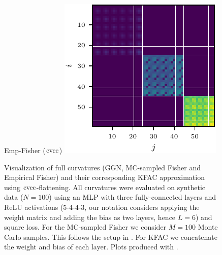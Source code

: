 \begin{figure}[t!]
\begin{minipage}[t]{0.485\linewidth}
  \end{minipage}
  \hfill
  \begin{minipage}[t]{0.485\linewidth}
    \centering
    Emp-Fisher ($\operatorname{cvec}$)\vspace{1ex}
    \includegraphics[width=0.8\linewidth]{../kfs/plots/synthetic_cvec_empfisher_kfac.pdf}
  \end{minipage}
    \caption{Visualization of full curvatures (GGN, MC-sampled Fisher and Empirical Fisher) and their corresponding KFAC approximation using $\operatorname{cvec}$-flattening. All curvatures were evaluated on synthetic data ($N = 100$) using an MLP with three fully-connected layers and ReLU activations (5-4-4-3, our notation considers applying the weight matrix and adding the bias as two layers, hence $L=6$) and square loss. For the MC-sampled Fisher we consider $M = 100$ Monte Carlo samples. This follows the setup in . For KFAC we concatenate the weight and bias of each layer. 
    Plots produced with .}
    \label{fig:kfac-full-comparison}
\end{figure}

